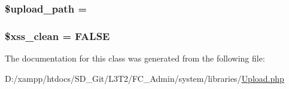 \subsubsection[{\$upload\+\_\+path}]{\setlength{\rightskip}{0pt plus 5cm}\$upload\+\_\+path = \textquotesingle{}\textquotesingle{}}\label{class_c_i___upload_a38507bf82f955d4b13642a3c7fd6e773}
\hypertarget{class_c_i___upload_a0f2ee8861c0b3164a5c6e126dd98c0cc}{}
\subsubsection[{\$xss\+\_\+clean}]{\setlength{\rightskip}{0pt plus 5cm}\$xss\+\_\+clean = F\+A\+L\+S\+E}\label{class_c_i___upload_a0f2ee8861c0b3164a5c6e126dd98c0cc}


The documentation for this class was generated from the following file\+:\begin{DoxyCompactItemize}
\item 
D\+:/xampp/htdocs/\+S\+D\+\_\+\+Git/\+L3\+T2/\+F\+C\+\_\+\+Admin/system/libraries/\hyperlink{_upload_8php}{Upload.\+php}\end{DoxyCompactItemize}
